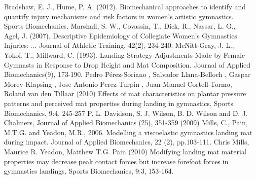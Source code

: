 \documentclass[12pt,aps,prb,preprint]{revtex4-1}   %
\begin{document}
\newpage
\begin{thebibliography}{7}
Bradshaw, E. J., Hume, P. A. (2012). Biomechanical approaches to identify and quantify injury mechanisms and risk factors in women's artistic gymnastics. Sports Biomechanics.
Marshall, S. W., Covassin, T., Dick, R., Nassar, L. G., Agel, J. (2007). Descriptive Epidemiology of Collegiate Women's Gymnastics Injuries: ... Journal of Athletic Training, 42(2), 234-240.
McNitt-Gray, J. L., Yokoi, T., Millward, C. (1993). Landing Strategy Adjustments Made by Female Gymnasts in Response to Drop Height and Mat Composition. Journal of Applied Biomechanics(9), 173-190.
Pedro Pérez-Soriano , Salvador Llana-Belloch , Gaspar Morey-Klapsing , Jose Antonio Perez-Turpin , Juan Manuel Cortell-Tormo, Roland van den Tillaar (2010) Effects of mat characteristics on plantar pressure patterns and perceived mat properties during landing in gymnastics, Sports Biomechanics, 9:4, 245-257
P. L. Davidson, S. J. Wilson, B. D. Wilson and D. J. Chalmers, Journal of Applied Biomechanics (25), 351-359 (2009)
Mills, C., Pain, M.T.G. and Yeadon, M.R., 2006. Modelling a viscoelastic gymnastics landing mat during impact. Journal of Applied Biomechanics, 22 (2), pp.103-111.
Chris Mills, Maurice R. Yeadon, Matthew T.G. Pain (2010) Modifying landing mat material properties may decrease peak contact forces but increase forefoot forces in gymnastics landings, Sports Biomechanics, 9:3, 153-164.
\end{thebibliography}
\end{document}
